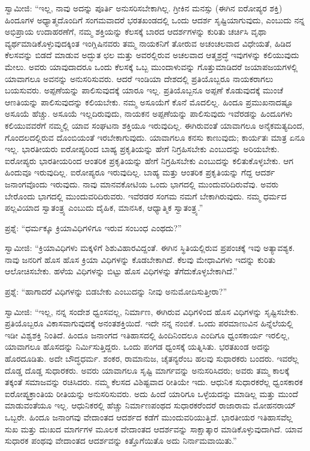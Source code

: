 ಸ್ವಾಮೀಜಿ: “ಇಲ್ಲ, ನಾವು ಅದನ್ನು ಪೂರ್ತಿ ಅನುಸರಿಸಬೇಕಾಗಿಲ್ಲ. ಗ್ರೀಕಿನ ಮನಸ್ಸು (ಈಗಿನ ಐರೋಪ್ಯರ ಶಕ್ತಿ) ಹಿಂದೂಗಳ ಅಧ್ಯಾತ್ಮದೊಂದಿಗೆ ಸಂಗಮವಾದರೆ ಭರತಖಂಡದಲ್ಲಿ ಒಂದು ಆದರ್ಶ ಸೃಷ್ಟಿಯಾಗುವುದು, ಎಂಬುದು ನನ್ನ ಅಭಿಪ್ರಾಯ ಉದಾಹರಣೆಗೆ, ನಮ್ಮ ಶಕ್ತಿಯನ್ನು ಕೆಲಸಕ್ಕೆ ಬಾರದ ಆದರ್ಶಗಳನ್ನು ಕುರಿತು ಚರ್ಚಿಸಿ ವೃಥಾ ವ್ಯರ್ಥಮಾಡಿಕೊಳ್ಳುವುದಕ್ಕಿಂತ ಇಂಗ್ಲಿಷಿನವರು ತಮ್ಮ ನಾಯಕನಿಗೆ ತೋರುವ ಅಚಂಚಲವಾದ ವಿಧೇಯತೆ, ಹಿಡಿದ ಕೆಲಸವನ್ನು ಬಿಡದೆ ಮಾಡುವ ಅದ್ಭುತ ಛಲ ಮತ್ತು ಅವರಲ್ಲಿರುವ ಅಚಲವಾದ ಆತ್ಮಶ್ರದ್ಧೆ ಇವುಗಳನ್ನು ಕಲಿಯುವುದು ಮೇಲು. ಅವರು ಯಾವುದಾದರೂ ಒಂದು ಕೆಲಸಕ್ಕೆ ಒಬ್ಬ ಮುಂದಾಳುವನ್ನು ಗೊತ್ತುಮಾಡಿದರೆ ಜಯಾಪಜಯಗಳಲ್ಲಿ ಯಾವಾಗಲೂ ಅವನನ್ನು ಅನುಸರಿಸುವರು. ಆದರೆ ಇಂಡಿಯಾ ದೇಶದಲ್ಲಿ ಪ್ರತಿಯೊಬ್ಬರೂ ನಾಯಕರಾಗಲು ಬಯಸುವರು. ಅಪ್ಪಣೆಯನ್ನು ಪಾಲಿಸುವುದಕ್ಕೆ ಯಾರೂ ಇಲ್ಲ. ಪ್ರತಿಯೊಬ್ಬನೂ ಅಪ್ಪಣೆ ಕೊಡುವುದಕ್ಕೆ ಮುಂಚೆ ಆಣತಿಯನ್ನು ಪಾಲಿಸುವುದನ್ನು ಕಲಿಯಬೇಕು. ನಮ್ಮ ಅಸೂಯೆಗೆ ಕೊನೆ ಮೊದಲಿಲ್ಲ. ಹಿಂದೂ ಪ್ರಮುಖನಾದಷ್ಟೂ ಅಸೂಯೆ ಹೆಚ್ಚು. ಅಸೂಯೆ ಇಲ್ಲದಿರುವುದು, ನಾಯಕನ ಅಪ್ಪಣೆಯನ್ನು ಪಾಲಿಸುವುದು ಇವೆರಡನ್ನು ಹಿಂದೂಗಳು ಕಲಿಯುವವರೆಗೆ ನಮ್ಮಲ್ಲಿ ಯಾವ ಸಂಘಟನಾ ಶಕ್ತಿಯೂ ಇರುವುದಿಲ್ಲ. ಈಗಿರುವಂತೆ ಯಾವಾಗಲೂ ಅನೈಕಮತ್ಯದಿಂದ, ಗೊಂದಲದಲ್ಲಿರುವ ದೊಂಬಿಯಂತೆ ಇರಬೇಕಾಗುವುದು. ಯಾವಾಗಲೂ ಕನಸು ಕಾಣುವುದು; ಕಾರ್ಯತಃ ಮಾತ್ರ ಏನೂ ಇಲ್ಲ. ಭಾರತೀಯರು ಐರೋಪ್ಯರಿಂದ ಬಾಹ್ಯ ಪ್ರಕೃತಿಯನ್ನು ಹೇಗೆ ನಿಗ್ರಹಿಸಬೇಕು ಎಂಬುದನ್ನು ಅರಿಯಬೇಕು. ಐರೋಪ್ಯರು ಭಾರತೀಯರಿಂದ ಆಂತರಿಕ ಪ್ರಕೃತಿಯನ್ನು ಹೇಗೆ ನಿಗ್ರಹಿಸಬೇಕು ಎಂಬುದನ್ನು ಕಲಿತುಕೊಳ್ಳಬೇಕು. ಆಗ ಹಿಂದುವೂ ಇರುವುದಿಲ್ಲ. ಐರೋಪ್ಯರೂ ಇರುವುದಿಲ್ಲ. ಬಾಹ್ಯ ಮತ್ತು ಆಂತರಿಕ ಪ್ರಕೃತಿಯನ್ನು ಗೆದ್ದ ಆದರ್ಶ ಜನಾಂಗವೊಂದು ಇರುವುದು. ನಾವು ಮಾನವಕೋಟಿಯ ಒಂದು ಭಾಗದಲ್ಲಿ ಮುಂದುವರಿದಿರುವೆವು. ಅವರು ಬೇರೊಂದು ಭಾಗದಲ್ಲಿ ಮುಂದುವರಿದಿರುವರು. ಇವೆರಡರ ಸಂಗಮ ನಮಗೆ ಬೇಕಾಗಿರುವುದು. ನಮ್ಮ ಧರ್ಮದ ಪಲ್ಲವಿಯಾದ ಸ್ವಾತಂತ್ರ್ಯ ಎಂಬುದು ದೈಹಿಕ, ಮಾನಸಿಕ, ಆಧ್ಯಾತ್ಮಿಕ ಸ್ವಾತಂತ್ರ್ಯ.”

ಪ್ರಶ್ನೆ: “ಧರ್ಮಕ್ಕೂ ಕ್ರಿಯಾವಿಧಿಗಳಿಗೂ ಇರುವ ಸಂಬಂಧ ಎಂಥದು?”

ಸ್ವಾಮೀಜಿ: “ಕ್ರಿಯಾವಿಧಿಗಳು ಮಕ್ಕಳಿಗೆ ಶಿಶುವಿಹಾರವಿದ್ದಂತೆ. ಈಗಿನ ಸ್ಥಿತಿಯಲ್ಲಿರುವ ಪ್ರಪಂಚಕ್ಕೆ ಇವು ಅತ್ಯಾವಶ್ಯಕ. ನಾವು ಜನರಿಗೆ ಹೊಸ ಹೊಸ ಕ್ರಿಯಾ ವಿಧಿಗಳನ್ನು ಕೊಡಬೇಕಾಗಿದೆ. ಕೆಲವು ಮೇಧಾವಿಗಳು ಇದನ್ನು ಕುರಿತು ಆಲೋಚಿಸಬೇಕು. ಹಳೆಯ ವಿಧಿಗಳನ್ನು ಬಿಟ್ಟು ಹೊಸ ವಿಧಿಗಳನ್ನು ತೆಗೆದುಕೊಳ್ಳಬೇಕಾಗಿದೆ.”

ಪ್ರಶ್ನೆ: “ಹಾಗಾದರೆ ವಿಧಿಗಳನ್ನು ಬಿಡಬೇಕು ಎಂಬುದನ್ನು ನೀವು ಅನುಮೋದಿಸುತ್ತೀರಾ?”

ಸ್ವಾಮೀಜಿ: “ಇಲ್ಲ, ನನ್ನ ಸಂದೇಶ ಧ್ವಂಸವಲ್ಲ, ನಿರ್ಮಾಣ, ಈಗಿರುವ ವಿಧಿಗಳಿಂದ ಹೊಸ ವಿಧಿಗಳನ್ನು ಸೃಷ್ಟಿಸಬೇಕು. ಪ್ರತಿಯೊಬ್ಬರೂ ವಿಕಾಸವಾಗುವುದಕ್ಕೆ ಅನಂತಶಕ್ತಿಯಿದೆ. ಇದೇ ನನ್ನ ನಂಬಿಕೆ. ಒಂದು ಪರಮಾಣುವಿನ ಹಿನ್ನೆಲೆಯಲ್ಲಿ ಇಡೀ ವಿಶ್ವಶಕ್ತಿ ನಿಂತಿದೆ. ಹಿಂದೂ ಜನಾಂಗದ ಇತಿಹಾಸದಲ್ಲಿ ಹಿಂದಿನಿಂದಲೂ ಎಂದಿಗೂ ಧ್ವಂಸಕಾರ್ಯ ಇರಲಿಲ್ಲ, ಯಾವಾಗಲೂ ಹೊಸದನ್ನು ನಿರ್ಮಿಸುತ್ತಿದ್ದರು. ಒಂದು ಪಂಗಡ ಧ್ವಂಸಕ್ಕೆ ಯತ್ನಿಸಿತು. ಭರತಖಂಡ ಅದನ್ನು ಹೊರದೂಡಿತು. ಅದೇ ಬೌದ್ಧಧರ್ಮ. ಶಂಕರ, ರಾಮಾನುಜ, ಚೈತನ್ಯರೆಂಬ ಹಲವು ಸುಧಾರಕರು ಬಂದರು. ಇವರೆಲ್ಲ ದೊಡ್ಡ ದೊಡ್ಡ ಸುಧಾರಕರು. ಅವರು ಯಾವಾಗಲೂ ಸೃಷ್ಟಿ ಮಾರ್ಗವನ್ನು ಅನುಸರಿಸಿದರು; ಅವರು ತಮ್ಮ ಕಾಲಕ್ಕೆ ತಕ್ಕಂತೆ ಸಮಾಜವನ್ನು ರಚಿಸಿದರು. ನಮ್ಮ ಕೆಲಸದ ವಿಶಿಷ್ಟವಾದ ರೀತಿಯೇ ಇದು. ಆಧುನಿಕ ಸುಧಾರಕರೆಲ್ಲ ಧ್ವಂಸಕಾರಕ ಐರೋಪ್ಯಕ್ರಾಂತಿಯ ರೀತಿಯನ್ನು ಅನುಸರಿಸುವರು. ಅದು ಹಿಂದೆ ಯಾರಿಗೂ ಒಳ್ಳೆಯದನ್ನು ಮಾಡಿಲ್ಲ ಮತ್ತು ಮುಂದೆ ಮಾಡುವಂತೆಯೂ ಇಲ್ಲ. ಆಧುನಿಕರಲ್ಲಿ ಹೆಚ್ಚು ನಿರ್ಮಾಣಪಂಥದ ಸುಧಾರಕರೆಂದರೆ ರಾಜಾರಾಮ ಮೋಹನರಾಯ್​ ಒಬ್ಬರೇ. ಹಿಂದೂ ಜನಾಂಗವು ವೇದಾಂತದ ಆದರ್ಶದ ಕಡೆಗೆ ಮುಂದುವರಿಯುತ್ತಿದೆ. ಭಾರತೀಯರ ಇತಿಹಾಸವೆಲ್ಲ ಸುಖ ಮತ್ತು ದುಃಖದ ಮಾರ್ಗಗಳ ಮೂಲಕ ವೇದಾಂತದ ಆದರ್ಶವನ್ನು ಸಾಕ್ಷಾತ್ಕಾರ ಮಾಡಿಕೊಳ್ಳುವುದಾಗಿದೆ. ಯಾವ ಸುಧಾರಕ ಪಂಥವು ವೇದಾಂತದ ಆದರ್ಶವನ್ನು ಕಿತ್ತೊಗೆಯಿತೊ ಅದು ನಿರ್ನಾಮವಾಯಿತು.”

